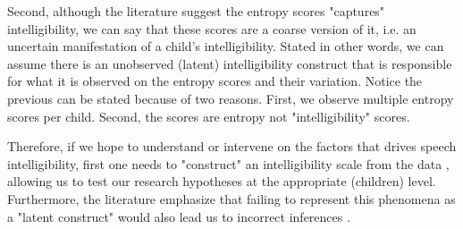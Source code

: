 Second, although the literature suggest the entropy scores "captures" intelligibility, we can say that these scores are a coarse version of it, i.e. an uncertain manifestation of a child's intelligibility. Stated in other words, we can assume there is an unobserved (latent) intelligibility construct that is responsible for what it is observed on the entropy scores and their variation. Notice the previous can be stated because of two reasons. First, we observe multiple entropy scores per child. Second, the scores are entropy not "intelligibility" scores.

Therefore, if we hope to understand or intervene on the factors that drives speech intelligibility, first one needs to "construct" an intelligibility scale from the data \citep{Carroll_2006}, allowing us to test our research hypotheses at the appropriate (children) level. Furthermore, the literature emphasize that failing to represent this phenomena as a "latent construct" would also lead us to incorrect inferences \citep{deHaan_et_al_2019}.

